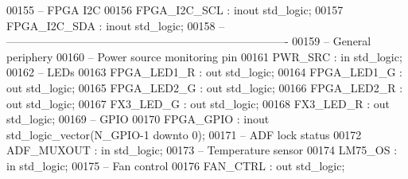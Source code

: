 \begin{DoxyCode}
00155 \textcolor{keyword}{         -- FPGA I2C}
00156       \textcolor{vhdlchar}{FPGA_I2C_SCL}      \textcolor{vhdlchar}{:} \textcolor{keywordflow}{inout}  \textcolor{comment}{std\_logic};
00157       \textcolor{vhdlchar}{FPGA_I2C_SDA}      \textcolor{vhdlchar}{:} \textcolor{keywordflow}{inout}  \textcolor{comment}{std\_logic};
00158 \textcolor{keyword}{      -- ----------------------------------------------------------------------------}
00159 \textcolor{keyword}{      -- General periphery}
00160 \textcolor{keyword}{         -- Power source monitoring pin}
00161       \textcolor{vhdlchar}{PWR_SRC}           \textcolor{vhdlchar}{:} \textcolor{keywordflow}{in}     \textcolor{comment}{std\_logic};
00162 \textcolor{keyword}{         -- LEDs          }
00163       \textcolor{vhdlchar}{FPGA_LED1_R}       \textcolor{vhdlchar}{:} \textcolor{keywordflow}{out}    \textcolor{comment}{std\_logic};
00164       \textcolor{vhdlchar}{FPGA_LED1_G}       \textcolor{vhdlchar}{:} \textcolor{keywordflow}{out}    \textcolor{comment}{std\_logic};
00165       \textcolor{vhdlchar}{FPGA_LED2_G}       \textcolor{vhdlchar}{:} \textcolor{keywordflow}{out}    \textcolor{comment}{std\_logic};
00166       \textcolor{vhdlchar}{FPGA_LED2_R}       \textcolor{vhdlchar}{:} \textcolor{keywordflow}{out}    \textcolor{comment}{std\_logic};
00167       \textcolor{vhdlchar}{FX3_LED_G}         \textcolor{vhdlchar}{:} \textcolor{keywordflow}{out}    \textcolor{comment}{std\_logic};
00168       \textcolor{vhdlchar}{FX3_LED_R}         \textcolor{vhdlchar}{:} \textcolor{keywordflow}{out}    \textcolor{comment}{std\_logic};
00169 \textcolor{keyword}{         -- GPIO }
00170       \textcolor{vhdlchar}{FPGA_GPIO}         \textcolor{vhdlchar}{:} \textcolor{keywordflow}{inout}  \textcolor{comment}{std\_logic\_vector}\textcolor{vhdlchar}{(}\textcolor{vhdlchar}{N_GPIO}\textcolor{vhdlchar}{-}\textcolor{vhdllogic}{}\textcolor{vhdllogic}{1} \textcolor{keywordflow}{downto} \textcolor{vhdllogic}{}\textcolor{vhdllogic}{0}\textcolor{vhdlchar}{)};
00171 \textcolor{keyword}{         -- ADF lock status}
00172       \textcolor{vhdlchar}{ADF_MUXOUT}        \textcolor{vhdlchar}{:} \textcolor{keywordflow}{in}     \textcolor{comment}{std\_logic};
00173 \textcolor{keyword}{         -- Temperature sensor}
00174       \textcolor{vhdlchar}{LM75_OS}           \textcolor{vhdlchar}{:} \textcolor{keywordflow}{in}     \textcolor{comment}{std\_logic};
00175 \textcolor{keyword}{         -- Fan control }
00176       \textcolor{vhdlchar}{FAN_CTRL}          \textcolor{vhdlchar}{:} \textcolor{keywordflow}{out}    \textcolor{comment}{std\_logic};

\end{DoxyCode}
